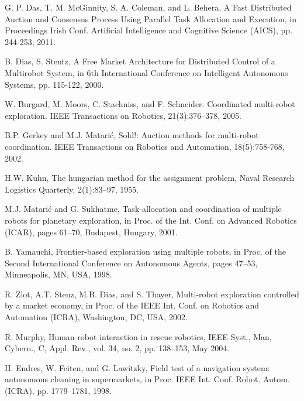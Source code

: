 \documentclass[letterpaper, 10 pt, conference]{ieeeconf}  %
\begin{document}



\begin{thebibliography}{99}

 G. P. Das, T. M. McGinnity, S. A. Coleman, and L. Behera, A Fast Distributed Auction and Consensus Process Using Parallel Task Allocation and Execution, in Proceedings Irish Conf. Artificial Intelligence and Cognitive Science (AICS), pp. 244-253, 2011.

 B. Dias, S. Stentz, A Free Market Architecture for Distributed Control of a Multirobot System, in 6th International Conference on Intelligent Autonomous Systems, pp. 115-122, 2000.

 W. Burgard, M. Moors, C. Stachniss, and F. Schneider. Coordinated multi-robot exploration. IEEE Transactions on Robotics, 21(3):376–378, 2005.

 B.P. Gerkey and M.J. Matarić, Sold!: Auction methods for multi-robot coordination. IEEE Transactions on Robotics and Automation,
18(5):758-768, 2002.

 H.W. Kuhn, The hungarian method for the assignment problem, Naval Research Logistics Quarterly, 2(1):83–97, 1955.

 M.J. Matarić and G. Sukhatme, Task-allocation and coordination of
multiple robots for planetary exploration, in Proc. of the Int. Conf. on Advanced Robotics (ICAR), pages 61–70, Budapest, Hungary, 2001.

 B. Yamauchi, Frontier-based exploration using multiple robots, in
Proc. of the Second International Conference on Autonomous Agents, pages 47–53, Minneapolis, MN, USA, 1998.

 R. Zlot, A.T. Stenz, M.B. Dias, and S. Thayer, Multi-robot exploration controlled by a market economy, in Proc. of the IEEE Int. Conf. on Robotics and Automation (ICRA), Washington, DC, USA, 2002.

 R. Murphy, Human-robot interaction in rescue robotics, IEEE Syst., Man, Cybern., C, Appl. Rev., vol. 34, no. 2, pp. 138–153, May 2004.

 H. Endres, W. Feiten, and G. Lawitzky, Field test of a navigation system: autonomous cleaning in supermarkets, in Proc. IEEE Int. Conf. Robot. Autom. (ICRA), pp. 1779–1781, 1998.


\end{thebibliography}
\end{document}

